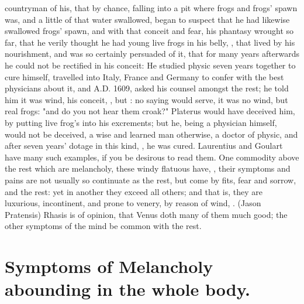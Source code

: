 {countryman of his, that by chance, falling into a pit where frogs and frogs'
spawn was, and a little of that water swallowed, began to suspect that he had
likewise swallowed frogs' spawn, and with that conceit and fear, his phantasy
wrought so far, that he verily thought he had young live frogs in his belly,
, that lived by his nourishment, and was so
certainly persuaded of it, that for many years afterwards he could not be
rectified in his conceit: He studied physic seven years together to cure
himself, travelled into Italy, France and Germany to confer with the best
physicians about it, and A.D. 1609, asked his counsel amongst the rest; he told
him it was wind, his conceit, \etc{}, but : no saying would serve, it was no wind, but real
frogs: "and do you not hear them croak?" Platerus would have deceived him, by
putting live frog's into his excrements; but he, being a physician himself,
would not be deceived,  a wise and learned man
otherwise, a doctor of physic, and after seven years' dotage in this kind,
, he was cured. Laurentius and Goulart have many
such examples, if you be desirous to read them. One commodity above the rest
which are melancholy, these windy flatuous have, , their
symptoms and pains are not usually so continuate as the rest, but come by fits,
fear and sorrow, and the rest: yet in another they exceed all others; and that
is, they are luxurious, incontinent, and prone to venery,
by reason of wind, . (Jason
Pratensis) Rhasis is of opinion, that Venus doth many of
them much good; the other symptoms of the mind be common with the rest.

\section[Symptoms In the Whole Body]{Symptoms of Melancholy abounding in the whole body.}

}
